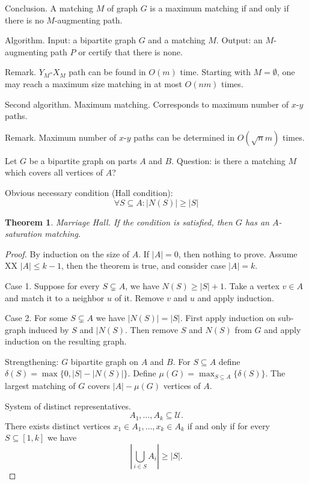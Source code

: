\documentclass[12pt,a4paper]{article} \usepackage{fontspec}
\newtheorem{theorem}{Theorem} \newtheorem{definition}{Definition}
\begin{document}
Conclusion.  A matching \(M\) of graph \(G\) is a maximum matching if and only
if there is no \(M\)-augmenting path.

Algorithm.  Input: a bipartite graph \(G\) and a matching \(M\).  Output: an
\(M\)-augmenting path \(P\) or certify that there is none.

Remark.  \(Y_M\)-\(X_M\) path can be found in \(O(m)\) time.  Starting with
\(M=\emptyset\), one may reach a maximum size matching in at most \(O(n m)\)
times.

Second algorithm.  Maximum matching.  Corresponds to maximum number of
\(x\)-\(y\) paths.

Remark.  Maximum number of \(x\)-\(y\) paths can be determined in \(O(\sqrt{n}
m)\) times.

Let \(G\) be a bipartite graph on parts \(A\) and \(B\).  Question: is there a
matching \(M\) which covers all vertices of \(A\)?

Obvious necessary condition (Hall condition): \[\forall S \subseteq A: |N(S)|
\geq |S|\]

\begin{theorem} Marriage Hall.  If the condition is satisfied, then \(G\) has an
\(A\)-saturation matching.  \end{theorem}

\begin{proof} By induction on the size of \(A\).  If \(|A| = 0\), then nothing
to prove.  Assume XX \(|A| \leq k -1\), then the theorem is true, and consider
case \(|A| = k\).

  Case 1. Suppose for every \(S \subsetneq A\), we have \(N(S) \geq |S|+1\).
Take a vertex \(v \in A\) and match it to a neighbor \(u\) of it.  Remove \(v\)
and \(u\) and apply induction.

  Case 2. For some \(S \subsetneq A\) we have \(|N(S)| = |S|\).  First apply
induction on sub-graph induced by \(S\) and \(|N(S)\).  Then remove \(S\) and
\(N(S)\) from \(G\) and apply induction on the resulting graph.

  Strengthening: \(G\) bipartite graph on \(A\) and \(B\).  For \(S \subseteq
A\) define \(\delta(S) = \max\{0, |S| - |N(S)|\}\).  Define \(\mu(G) = \max_{S
\subseteq A}\{\delta(S)\}\).  The largest matching of \(G\) covers \(|A| -
\mu(G)\) vertices of \(A\).

  System of distinct representatives. \[A_1, \dots, A_k \subseteq \mathcal{U}.\]
There exists distinct vertices \(x_1 \in A_1, \dots, x_k \in A_k\) if and only
if for every \(S \subseteq [1, k]\) we have \[\left| \bigcup_{i \in S} A_i
\right| \geq |S|.\] \end{proof}
\end{document}
